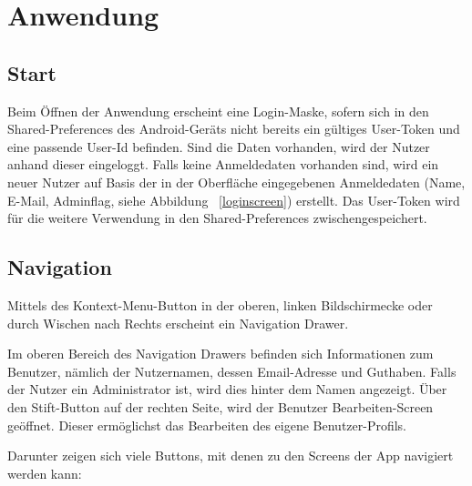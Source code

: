 \section{Anwendung}\label{sec:features}

\subsection{Start}\label{subsec:start}

Beim Öffnen der Anwendung erscheint eine Login-Maske, sofern sich in den Shared-Preferences des Android-Geräts nicht bereits ein gültiges User-Token und eine passende User-Id befinden.
Sind die Daten vorhanden, wird der Nutzer anhand dieser eingeloggt.
Falls keine Anmeldedaten vorhanden sind, wird ein neuer Nutzer auf Basis der in der Oberfläche eingegebenen Anmeldedaten (Name, E-Mail, Adminflag, siehe Abbildung ~\ref{loginscreen}) erstellt.
Das User-Token wird für die weitere Verwendung in den Shared-Preferences zwischengespeichert.


\subsection{Navigation} \label{subsec:navigation}

Mittels des Kontext-Menu-Button in der oberen, linken Bildschirmecke oder durch Wischen nach Rechts erscheint ein Navigation Drawer.

Im oberen Bereich des Navigation Drawers befinden sich Informationen zum Benutzer, nämlich der Nutzernamen, dessen Email-Adresse und Guthaben.
Falls der Nutzer ein Administrator ist, wird dies hinter dem Namen angezeigt.
Über den Stift-Button auf der rechten Seite, wird der Benutzer Bearbeiten-Screen geöffnet.
Dieser ermöglichst das Bearbeiten des eigene Benutzer-Profils.

Darunter zeigen sich viele Buttons, mit denen zu den Screens der App navigiert werden kann:

